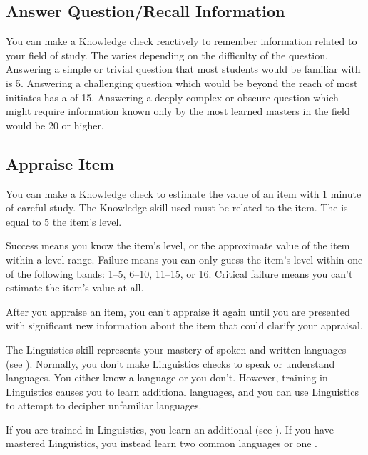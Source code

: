     \subsection{Answer Question/Recall Information}
        You can make a Knowledge check reactively to remember information related to your field of study. The  varies depending on the difficulty of the question. Answering a simple or trivial question that most students would be familiar with is  5. Answering a challenging question which would be beyond the reach of most initiates has a  of 15. Answering a deeply complex or obscure question which might require information known only by the most learned masters in the field would be  20 or higher.

    \subsection{Appraise Item}
        You can make a Knowledge check to estimate the value of an item with 1 minute of careful study. The Knowledge skill used must be related to the item.
        The  is equal to 5 \add the item's level.

        Success means you know the item's level, or the approximate value of the item within a level range.
        Failure means you can only guess the item's level within one of the following bands: 1--5, 6--10, 11--15, or 16\plus.
        Critical failure means you can't estimate the item's value at all.

        After you appraise an item, you can't appraise it again until you are presented with significant new information about the item that could clarify your appraisal.

\newpage
{}
        The Linguistics skill represents your mastery of spoken and written languages (see ).
        Normally, you don't make Linguistics checks to speak or understand languages.
        You either know a language or you don't.
        However, training in Linguistics causes you to learn additional languages, and you can use Linguistics to attempt to decipher unfamiliar languages.

        If you are trained in Linguistics, you learn an additional  (see ).
        If you have mastered Linguistics, you instead learn two common languages or one .

